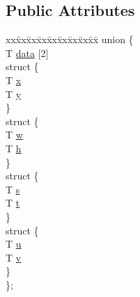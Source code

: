 \subsection*{Public Attributes}
\begin{DoxyCompactItemize}
\item 
\begin{tabbing}
xx\=xx\=xx\=xx\=xx\=xx\=xx\=xx\=xx\=\kill
union \{\\
\>T \hyperlink{structNSVec2_ab40b167d9bb6759f8c49cc8b136905a3}{data} \mbox{[}2\mbox{]}\\
\>struct \{\\
\>\>T \hyperlink{structNSVec2_a06fdf0c2e7c1a8ca6d03259b978d1f6e}{x}\\
\>\>T \hyperlink{structNSVec2_a95410f817c58a44b7af88079527cf7e6}{y}\\
\>\} \\
\>struct \{\\
\>\>T \hyperlink{structNSVec2_a9f38b9ce14ade7d2c54ca8d02f64c13d}{w}\\
\>\>T \hyperlink{structNSVec2_a2f980c16952258bf52f0e090067ea3b7}{h}\\
\>\} \\
\>struct \{\\
\>\>T \hyperlink{structNSVec2_a33019d6923382fae61a518264b8a6890}{s}\\
\>\>T \hyperlink{structNSVec2_af3722d802ef3cf396cae9b31a05035a3}{t}\\
\>\} \\
\>struct \{\\
\>\>T \hyperlink{structNSVec2_a5e9eaedf4d4980cf29cef3d27551d1ae}{u}\\
\>\>T \hyperlink{structNSVec2_a2d1a92faf45f189d0dc0dce956afbaab}{v}\\
\>\} \\
\}; \\

\end{tabbing}\end{DoxyCompactItemize}


